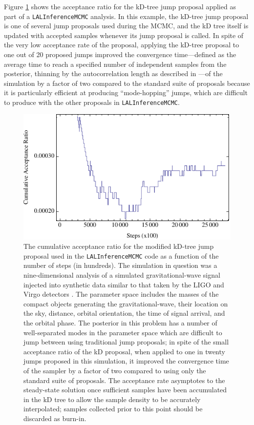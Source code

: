 \documentclass{rsos}
\begin{document}
Figure \ref{fig:accratio} shows the acceptance ratio for the kD-tree
jump proposal applied as part of a \texttt{LALInferenceMCMC} analysis.
In this example, the kD-tree jump proposal is one of several jump
proposals used during the MCMC, and the kD tree itself is updated with
accepted samples whenever its jump proposal is called. In spite of the
very low acceptance rate of the proposal, applying the kD-tree
proposal to one out of 20 proposed jumps improved the convergence
time---defined as the average time to reach a specified number of
independent samples from the posterior, thinning by the
autocorrelation length as described in \cite{Veitch:2014}---of the
simulation by a factor of two compared to the standard suite of
proposals because it is particularly efficient at producing
``mode-hopping'' jumps, which are difficult to produce with the other
proposals in \texttt{LALInferenceMCMC}.

\begin{figure}
  \begin{center}
    \includegraphics[width=0.8\columnwidth]{linearlog3}
  \end{center}
  \caption{\label{fig:accratio} The cumulative acceptance
    ratio for the modified kD-tree jump proposal used in the
    \texttt{LALInferenceMCMC} code as a function of the number of
    steps (in hundreds). The simulation in question was a
    nine-dimensional analysis of a simulated gravitational-wave signal
    injected into synthetic data similar to that taken by the LIGO
    and Virgo detectors \protect\cite{AdvLIGO,AdvVirgo}.  The parameter space
    includes the masses of the compact objects generating the
    gravitational-wave, their location on the sky, distance, orbital
    orientation, the time of signal arrival, and the orbital phase.
    The posterior in this problem has a number of well-separated modes
    in the parameter space which are difficult to jump between using
    traditional jump proposals; in spite of the small acceptance ratio
    of the kD proposal, when applied to one in twenty jumps proposed
    in this simulation, it improved the convergence time of the sampler by a factor of two
    compared to using only the standard suite of proposals. 
    The acceptance rate asymptotes to the steady-state solution once sufficient samples have been accumulated in the kD tree to allow the sample density to be accurately interpolated; samples collected
prior to this point should be discarded as burn-in.
  }
\end{figure}
\end{document}
